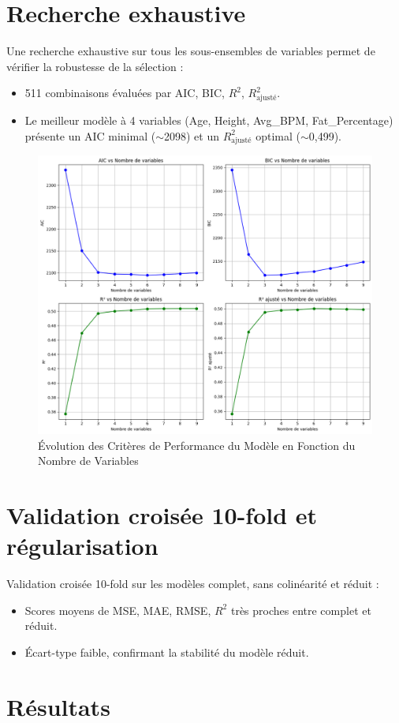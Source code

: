 \documentclass[12pt,a4paper]{article}
\begin{document}
\section{Recherche exhaustive}
Une recherche exhaustive sur tous les sous-ensembles de variables permet de vérifier la robustesse de la sélection :
\begin{itemize}
\item 511 combinaisons évaluées par AIC, BIC, $R^2$, $R^2_{\text{ajusté}}$.
\item Le meilleur modèle à 4 variables (Age, Height, Avg\_BPM, Fat\_Percentage) présente un AIC minimal ($\sim$2098) et un $R^2_{\text{ajusté}}$ optimal ($\sim$0,499).
\end{itemize}

\begin{figure}[H]
  \centering
  \includegraphics[width=0.7\linewidth]{information_criterion.png}
  \caption{Évolution des Critères de Performance du Modèle en Fonction du Nombre de Variables}
\end{figure}

\section{Validation croisée 10-fold et régularisation}

Validation croisée 10-fold sur les modèles complet, sans colinéarité et réduit :
\begin{itemize}
\item Scores moyens de MSE, MAE, RMSE, $R^2$ très proches entre complet et réduit.
\item Écart-type faible, confirmant la stabilité du modèle réduit.
\end{itemize}

\section{Résultats}
\end{document}
